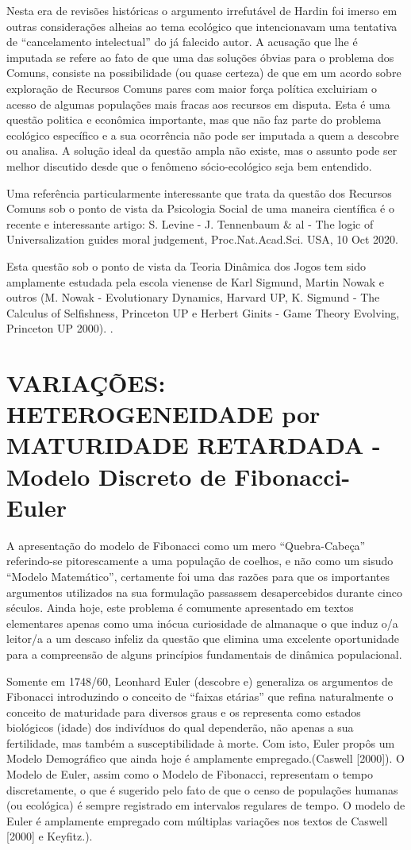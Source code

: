     Nesta era de revisões históricas o argumento irrefutável de Hardin foi imerso em outras considerações alheias ao tema ecológico que intencionavam uma tentativa de ``cancelamento intelectual'' do já falecido autor. A acusação que lhe é imputada se refere ao fato de que uma das soluções óbvias para o problema dos Comuns, consiste na possibilidade (ou quase certeza) de que em um acordo sobre exploração de Recursos Comuns pares com maior força política excluiriam o acesso de algumas populações mais fracas aos recursos em disputa. Esta é uma questão politica e econômica importante, mas que não faz parte do problema ecológico específico e a sua ocorrência não pode ser imputada a quem a descobre ou analisa. A solução ideal da questão ampla não existe, mas o assunto pode ser melhor discutido desde que o fenômeno sócio-ecológico seja bem entendido.

    Uma referência particularmente interessante que trata da questão dos Recursos Comuns sob o ponto de vista da Psicologia Social de uma maneira científica é o recente e interessante artigo: S. Levine - J. Tennenbaum \& al - The logic of Universalization guides moral judgement, Proc.Nat.Acad.Sci. USA, 10 Oct 2020.

    Esta questão sob o ponto de vista da Teoria Dinâmica dos Jogos tem sido amplamente estudada pela escola vienense de Karl Sigmund, Martin Nowak e outros (M. Nowak - Evolutionary Dynamics, Harvard UP, K. Sigmund - The Calculus of Selfishness, Princeton UP e Herbert Ginits - Game Theory Evolving, Princeton UP 2000). 
. 
\section{VARIAÇÕES: HETEROGENEIDADE por MATURIDADE RETARDADA - Modelo Discreto de Fibonacci-Euler}

    A apresentação do modelo de Fibonacci como um mero ``Quebra-Cabeça'' referindo-se pitorescamente a uma população de coelhos, e não como um sisudo ``Modelo Matemático'', certamente foi uma das razões para que os importantes argumentos utilizados na sua formulação passassem desapercebidos durante cinco séculos. Ainda hoje, este problema é comumente apresentado em textos elementares apenas como uma inócua curiosidade de almanaque o que induz o/a leitor/a a um descaso infeliz da questão que elimina uma excelente oportunidade para a compreensão de alguns princípios fundamentais de dinâmica populacional.

    Somente em 1748/60, Leonhard Euler (descobre e) generaliza os argumentos de Fibonacci introduzindo o conceito de ``faixas etárias'' que refina naturalmente o conceito de maturidade para diversos graus e os representa como estados biológicos (idade) dos indivíduos do qual dependerão, não apenas a sua fertilidade, mas também a susceptibilidade à morte. Com isto, Euler propôs um Modelo Demográfico que ainda hoje é amplamente empregado.(Caswell [2000]). O Modelo de Euler, assim como o Modelo de Fibonacci, representam o tempo discretamente, o que é sugerido pelo fato de que o censo de populações humanas (ou ecológica) é sempre registrado em intervalos regulares de tempo. O modelo de Euler é amplamente empregado com múltiplas variações nos textos de Caswell [2000] e Keyfitz.).

